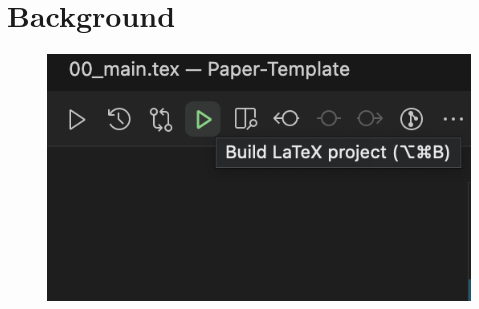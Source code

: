 \documentclass[00_main.tex]{subfiles}
\begin{document}
\setcounter{section}{1}
\section{Background}

\begin{figure}[ht]
    \begin{center}
        \includegraphics{img/01.png}
        \label{img:test}
    \end{center}
\end{figure}

\blindtext
\end{document}
